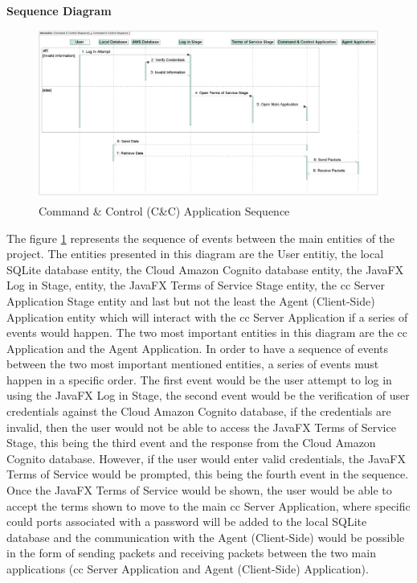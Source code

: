 \newpage

\noindent
\textbf{Sequence Diagram}

\begin{figure}[h]
    \centering
    \includegraphics[width=1.0\textwidth]{images/command-control-sequence.pdf}
    \captionsetup{justification=centering}
    \caption[Command \& Control Sequence]{Command \& Control (C\&C) Application Sequence}
    \label{fig:command-sequence}
\end{figure}

The figure \ref{fig:command-sequence} represents the sequence of events between the main
entities of the project. The entities presented in this diagram are the User entitiy,
the local SQLite database entity, the Cloud Amazon Cognito database entity, the JavaFX Log in Stage,
entity, the JavaFX Terms of Service Stage entity, the \acrfull{cc} Server Application Stage
entity and last but not the least the Agent (Client-Side) Application entity which will
interact with the \acrfull{cc} Server Application if a series of events would happen.
The two most important entities in this diagram are the \acrfull{cc} Application and the
Agent Application. In order to have a sequence of events between the two most important
mentioned entities, a series of events must happen in a specific order. The first event
would be the user attempt to log in using the JavaFX Log in Stage, the second event would be the verification
of user credentials against the Cloud Amazon Cognito database, if the credentials are invalid,
then the user would not be able to access the JavaFX Terms of Service Stage, this being the
third event and the response from the Cloud Amazon Cognito database. However, if the
user would enter valid credentials, the JavaFX Terms of Service would be prompted, this being
the fourth event in the sequence. Once the JavaFX Terms of Service would be shown, the user
would be able to accept the terms shown to move to the main \acrfull{cc} Server Application,
where specific could ports associated with a password will be added to the local SQLite
database and the communication with the Agent (Client-Side) would be possible in the form
of sending packets and receiving packets between the two main applications (\acrfull{cc}
Server Application and Agent (Client-Side) Application).

